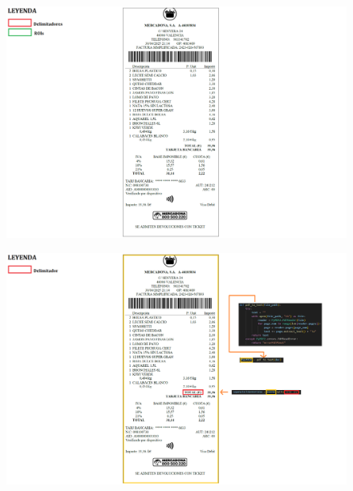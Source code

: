\documentclass{beamer}
\begin{document}
		\begin{frame}
			\begin{figure}
				\centering
				\includegraphics[width=1\linewidth]{imgEspecifiques/ticketExtraccioA.png}
				\label{fig:ticketExtraccioA}
			\end{figure}
		\end{frame}
		
	
		
		\begin{frame}
			\begin{figure}
				\centering
				\includegraphics[width=1\linewidth]{imgEspecifiques/ticketExtraccioB.png}
				\label{fig:ticketExtraccioB}
			\end{figure}
		\end{frame}
		
\end{document}
